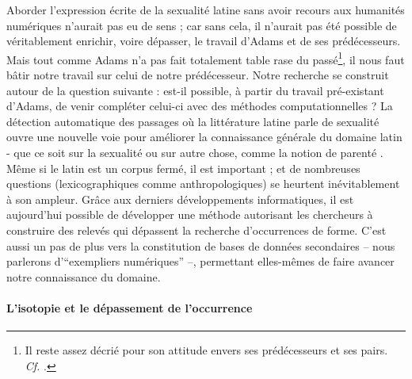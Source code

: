 Aborder l'expression écrite de la sexualité latine sans avoir recours aux humanités numériques n'aurait pas eu de sens ; car sans cela, il n'aurait pas été possible de véritablement enrichir, voire dépasser, le travail d'Adams et de ses prédécesseurs. Mais tout comme Adams n'a pas fait totalement table rase du passé\footnote{Il reste assez décrié pour son attitude envers ses prédécesseurs et ses pairs. \textit{Cf.} \textcite{richlin_sexual_1978}.}, il nous faut bâtir notre travail sur celui de notre prédécesseur. Notre recherche se construit autour de la question suivante : est-il possible, à partir du travail pré-existant d'Adams, de venir compléter celui-ci avec des méthodes computationnelles ? La détection automatique des passages où la littérature latine parle de sexualité ouvre une nouvelle voie pour améliorer la connaissance générale du domaine latin - que ce soit sur la sexualité ou sur autre chose, comme la notion de parenté%
. Même si le latin est un corpus fermé, il est important ; et de nombreuses questions (lexicographiques comme anthropologiques) se heurtent inévitablement à son ampleur. %
Grâce aux derniers développements informatiques, il est aujourd'hui possible de développer une méthode autorisant les chercheurs à construire des relevés qui dépassent la recherche d'occurrences de forme. C'est aussi un pas de plus vers la constitution de bases de données secondaires -- nous parlerons d'\enquote{exempliers numériques} --, permettant elles-mêmes de faire avancer notre connaissance du domaine.


\paragraph{L'isotopie et le dépassement de l'occurrence}

